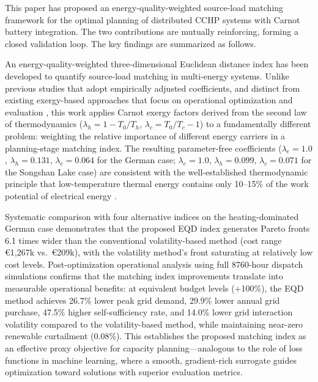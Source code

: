 This paper has proposed an energy-quality-weighted source-load matching framework for the optimal planning of distributed CCHP systems with Carnot battery integration. The two contributions are mutually reinforcing, forming a closed validation loop. The key findings are summarized as follows.

An energy-quality-weighted three-dimensional Euclidean distance index has been developed to quantify source-load matching in multi-energy systems. Unlike previous studies that adopt empirically adjusted coefficients, and distinct from existing exergy-based approaches that focus on operational optimization and evaluation \cite{li2022exergyflow,chen2024joint}, this work applies Carnot exergy factors derived from the second law of thermodynamics ($\lambda_h = 1 - T_0/T_h$, $\lambda_c = T_0/T_c - 1$) to a fundamentally different problem: weighting the relative importance of different energy carriers in a planning-stage matching index. The resulting parameter-free coefficients ($\lambda_e = 1.0$, $\lambda_h = 0.131$, $\lambda_c = 0.064$ for the German case; $\lambda_e = 1.0$, $\lambda_h = 0.099$, $\lambda_c = 0.071$ for the Songshan Lake case) are consistent with the well-established thermodynamic principle that low-temperature thermal energy contains only 10--15\% of the work potential of electrical energy \cite{hu2020eqc,dincer2001energy}.

Systematic comparison with four alternative indices on the heating-dominated German case demonstrates that the proposed EQD index generates Pareto fronts 6.1 times wider than the conventional volatility-based method (cost range \euro{}1,267k vs.\ \euro{}209k), with the volatility method's front saturating at relatively low cost levels. Post-optimization operational analysis using full 8760-hour dispatch simulations confirms that the matching index improvements translate into measurable operational benefits: at equivalent budget levels (+100\%), the EQD method achieves 26.7\% lower peak grid demand, 29.9\% lower annual grid purchase, 47.5\% higher self-sufficiency rate, and 14.0\% lower grid interaction volatility compared to the volatility-based method, while maintaining near-zero renewable curtailment (0.08\%). This establishes the proposed matching index as an effective proxy objective for capacity planning---analogous to the role of loss functions in machine learning, where a smooth, gradient-rich surrogate guides optimization toward solutions with superior evaluation metrics.

